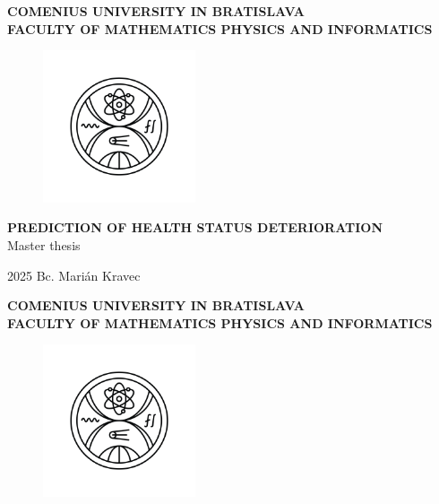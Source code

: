 \documentclass[12pt, twoside, openany]{book}
\def\mfrok{2025}
\def\mftitle{Prediction of health status deterioration} %
\def\mfthesistype{Master thesis}
\def\mfauthor{Bc. Marián Kravec}
\def\mfuniversity{COMENIUS UNIVERSITY IN BRATISLAVA}
\def\mffaculty{FACULTY OF MATHEMATICS PHYSICS AND INFORMATICS}
\begin{document}
\frontmatter


\thispagestyle{empty}

\noindent
\begin{minipage}{\textwidth}
    \begin{center}
        \textbf{\mfuniversity \\
        \mffaculty}
    \end{center}
\end{minipage}

\vfill
\begin{figure}[!hbt]
	\begin{center}
		\includegraphics[width=0.4\textwidth]{images/FMFI_logo_BP.png}
		\label{img:logo}
	\end{center}
\end{figure}
\begin{center}
		\textbf{\MakeUppercase{\Large\mftitle}}\\
		\mfthesistype
\end{center}
\vfill
\mfrok \hfill
\mfauthor
\cleardoublepage



\thispagestyle{empty}
\noindent
\begin{minipage}{\textwidth}
    \begin{center}
        \textbf{\mfuniversity \\
        \mffaculty}
    \end{center}
\end{minipage}

\vfill
\begin{figure}[!hbt]
    \begin{center}
        \includegraphics[width=0.4\textwidth]{images/FMFI_logo_BP.png}
        \label{img:logo_dark}
    \end{center}
\end{figure}
\end{document}
